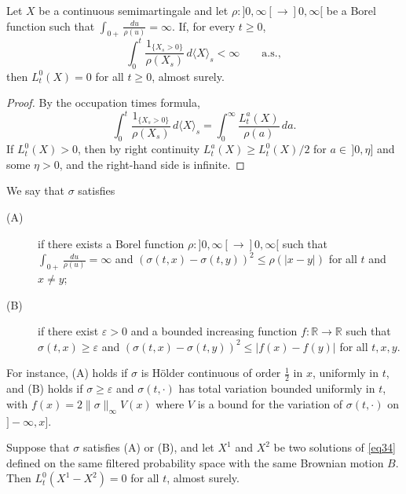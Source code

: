 \begin{lemma}\label{lem31}
	Let $X$ be a continuous semimartingale and let
	$\rho : ]0,\infty[ \to ]0,\infty[$ be a Borel function such that
	$\int_{0+}\frac{du}{\rho(u)}=\infty$. If, for every $t\geqslant 0$,
	\[
		\int_0^t \frac{1_{\{X_s > 0\}}}{\rho (X_s)}\,d\langle X \rangle_s < \infty \qquad\text{a.s.},
	\]
	then $L_t^0(X)=0$ for all $t\geqslant 0$, almost surely.
\end{lemma}

\begin{proof}
	By the occupation times formula,
	\[
		\int_0^t \frac{1_{\{X_s > 0\}}}{\rho (X_s)}\,d\langle X \rangle_s
		= \int_{0}^{\infty}\frac{L_t^a(X)}{\rho(a)}\,da .
	\]
	If $L^0_t(X) > 0$, then by right continuity $L^a_t(X)\geqslant L^0_t(X)/2$ for
	$a\in\,]0,\eta]$ and some $\eta>0$, and the right-hand side is infinite.
\end{proof}

We say that $\sigma$ satisfies
\begin{description}
	\item[(A)] if there exists a Borel function $\rho :]0 , \infty[ \to ]0 , \infty[$
	      such that $\int_{0+}\frac{du}{\rho(u)}= \infty$ and
	      $(\sigma(t,x)- \sigma(t,y))^2\leqslant \rho(|x-y|)$ for all $t$ and $x\neq y$;
	\item[(B)] if there exist $\varepsilon > 0$ and a bounded increasing function
	      $f:\mathbb{R}\to \mathbb{R}$ such that $\sigma (t,x) \geqslant \varepsilon$ and
	      $(\sigma(t,x)-\sigma(t,y))^2 \leqslant |f(x)-f(y)|$ for all $t,x,y$.
\end{description}
For instance, (A) holds if $\sigma$ is H\"older continuous of order $\frac{1}{2}$
in $x$, uniformly in $t$, and (B) holds if $\sigma \geqslant\varepsilon$ and
$\sigma(t,\cdot)$ has total variation bounded uniformly in $t$, with
$f(x) = 2\|\sigma\|_\infty V(x)$ where $V$ is a bound for the variation of
$\sigma(t,\cdot)$ on $]-\infty,x]$.

\begin{corollary}\label{cor31}
	Suppose that $\sigma$ satisfies (A) or (B), and let $X^1$ and $X^2$ be two
	solutions of \eqref{eq34} defined on the same filtered probability space with
	the same Brownian motion $B$. Then $L_t^0 (X^1 - X^2) = 0$ for all $t$, almost
	surely.
\end{corollary}

